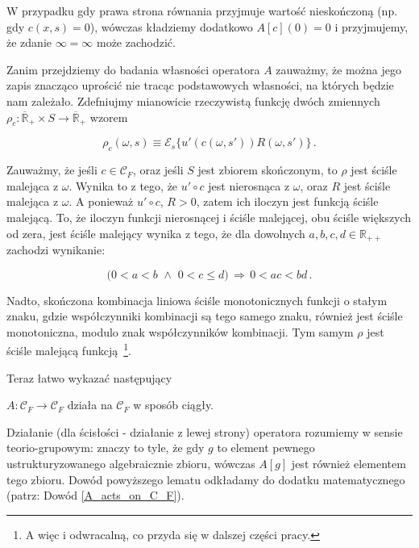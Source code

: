 W przypadku gdy prawa strona równania przyjmuje wartość nieskończoną (np. gdy $ c(x,s) = 0 $), wówczas kładziemy dodatkowo $ A[c](0) = 0 $ i przyjmujemy, że zdanie $\infty = \infty$ może zachodzić. 

Zanim przejdziemy do badania własności operatora $ A $ zauważmy, że można jego zapis znacząco uprościć nie tracąc podstawowych własności, na których będzie nam zależało. Zdefniujmy mianowicie rzeczywistą funkcję dwóch zmiennych $ \rho_c : \overline{\mathbb{R}}_+ \times S \rightarrow \overline{\mathbb{R}}_+$ wzorem

\begin{equation}
\rho_{c}(\omega,s) \equiv \mathcal{E}_s \bigl \{ u'(c(\omega,s'))R(\omega,s')	\bigl \} \,.
\end{equation}

Zauważmy, że jeśli $ c \in \mathcal{C}_F $, oraz jeśli $ S $ jest zbiorem skończonym, to $ \rho $ jest ściśle malejąca z $ \omega $. Wynika to z tego, że $ u' \circ c $ jest nierosnąca z $ \omega $, oraz $ R $ jest ściśle malejąca z $ \omega $. A ponieważ $ u' \circ c $, $ R > 0$, zatem ich iloczyn jest funkcją ściśle malejącą. To, że iloczyn funkcji nierosnącej i ściśle malejącej, obu ściśle większych od zera, jest ściśle malejący wynika z tego, że dla dowolnych $ a,b,c,d \in \mathbb{R}_{++} $ zachodzi wynikanie:

$$ \Big(0 < a < b \,\,\wedge\,\, 0 < c \leq d \Big)\,\Longrightarrow \,0 < ac < bd \,.$$
 
Nadto, skończona kombinacja liniowa ściśle monotonicznych funkcji o stałym znaku, gdzie współczynniki kombinacji są tego samego znaku, również jest ściśle monotoniczna, modulo znak współczynników kombinacji. Tym samym $ \rho $ jest ściśle malejącą funkcją~\footnote{A więc i odwracalną, co przyda się w dalszej części pracy.}. 

Teraz łatwo wykazać następujący

\begin{lemat}\label{on A}
	$ A : \mathcal{C}_{F} \rightarrow \mathcal{C}_{F}  $ działa na $ \mathcal{C}_F $ w sposób ciągły.
\end{lemat}

Działanie (dla ścisłości - działanie z lewej strony) operatora rozumiemy w sensie teorio-grupowym: znaczy to tyle, że gdy $ g $ to element pewnego ustrukturyzowanego algebraicznie zbioru, wówczas $ A[g] $ jest również elementem tego zbioru. Dowód powyższego lematu odkładamy do dodatku matematycznego (patrz: Dowód \ref{A_acts_on_C_F}).

